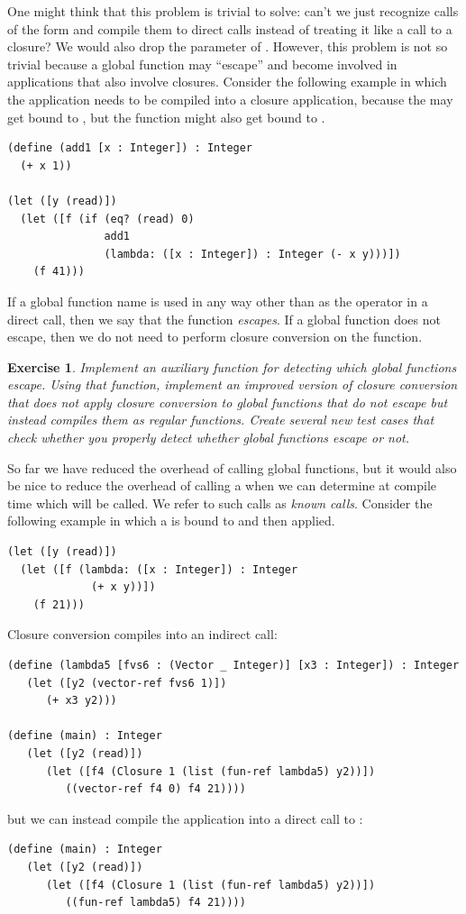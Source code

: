 \documentclass[11pt]{book}
\newtheorem{exercise}[theorem]{Exercise}
\begin{document}
One might think that this problem is trivial to solve: can't we just
recognize calls of the form 
and compile them to direct calls  instead of treating it like a call to a closure? We would
also drop the  parameter of .
%
However, this problem is not so trivial because a global function may
``escape'' and become involved in applications that also involve
closures. Consider the following example in which the application
 needs to be compiled into a closure application, because
the  may get bound to , but the 
function might also get bound to .
\begin{lstlisting}
(define (add1 [x : Integer]) : Integer
  (+ x 1))

(let ([y (read)])
  (let ([f (if (eq? (read) 0)
               add1
               (lambda: ([x : Integer]) : Integer (- x y)))])
    (f 41)))
\end{lstlisting}
If a global function name is used in any way other than as the
operator in a direct call, then we say that the function
\emph{escapes}. If a global function does not escape, then we do not
need to perform closure conversion on the function.

\begin{exercise}\normalfont
  Implement an auxiliary function for detecting which global
  functions escape. Using that function, implement an improved version
  of closure conversion that does not apply closure conversion to
  global functions that do not escape but instead compiles them as
  regular functions. Create several new test cases that check whether
  you properly detect whether global functions escape or not.
\end{exercise}

So far we have reduced the overhead of calling global functions, but
it would also be nice to reduce the overhead of calling a
 when we can determine at compile time which
 will be called. We refer to such calls as \emph{known
  calls}.  Consider the following example in which a  is
bound to  and then applied.
\begin{lstlisting}
(let ([y (read)])
  (let ([f (lambda: ([x : Integer]) : Integer
             (+ x y))])
    (f 21)))
\end{lstlisting}
Closure conversion compiles  into an indirect call:
\begin{lstlisting}
(define (lambda5 [fvs6 : (Vector _ Integer)] [x3 : Integer]) : Integer
   (let ([y2 (vector-ref fvs6 1)])
      (+ x3 y2)))

(define (main) : Integer
   (let ([y2 (read)])
      (let ([f4 (Closure 1 (list (fun-ref lambda5) y2))])
         ((vector-ref f4 0) f4 21))))
\end{lstlisting}
but we can instead compile the application  into a direct call
to :
\begin{lstlisting}
(define (main) : Integer
   (let ([y2 (read)])
      (let ([f4 (Closure 1 (list (fun-ref lambda5) y2))])
         ((fun-ref lambda5) f4 21))))
\end{lstlisting}
\end{document}
